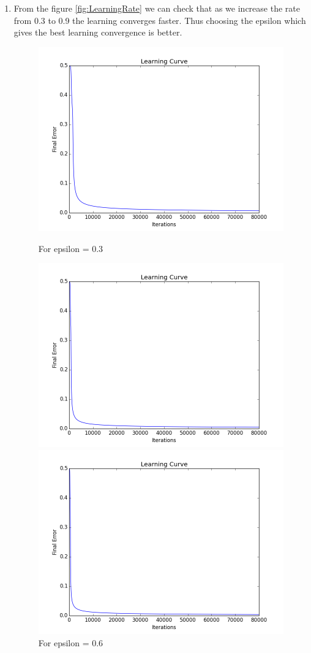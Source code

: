 \documentclass[10pt, letterpaper]{article}
\begin{document}
\begin{enumerate}
\item From the figure \ref{fig:LearningRate} we can check that as we increase the rate from 0.3 to 0.9 the learning converges faster. Thus choosing the epsilon which gives the best learning convergence is better.
\begin{figure}[h!]
\centering
\includegraphics[scale=0.5]{epsilonpt3}
\caption{For epsilon = 0.3}
\includegraphics[scale=0.5]{epsilonpt6}
\caption{For epsilon = 0.6}
\includegraphics[scale=0.5]{epsilonpt9}

\end{figure}
\end{enumerate}
\end{document}
